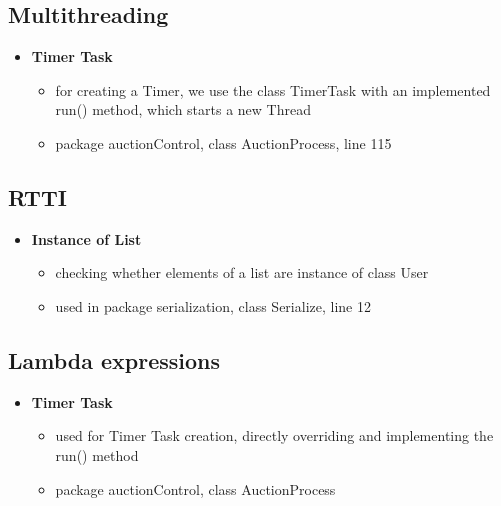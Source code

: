 \documentclass[
]{report}
\providecommand{\tightlist}{%
  \setlength{\itemsep}{0pt}\setlength{\parskip}{0pt}}
\begin{document}
\hypertarget{multithreading}{%
\subsection{Multithreading}\label{multithreading}}

\begin{itemize}
\tightlist
\item
  \textbf{Timer Task}

  \begin{itemize}
  \tightlist
  \item
    for creating a Timer, we use the class TimerTask with an implemented run() method, which starts a new Thread
  \item
    package auctionControl, class AuctionProcess, line 115
  \end{itemize}
\end{itemize}

\hypertarget{rtti}{%
\subsection{RTTI}\label{rtti}}

\begin{itemize}
\tightlist
\item
  \textbf{Instance of List}

  \begin{itemize}
  \tightlist
  \item
    checking whether elements of a list are instance of class User
  \item
    used in package serialization, class Serialize, line 12
  \end{itemize}
\end{itemize}

\hypertarget{lambda-expressions}{%
\subsection{Lambda expressions}\label{lambda-expressions}}

\begin{itemize}
\tightlist
\item
  \textbf{Timer Task}

  \begin{itemize}
  \tightlist
  \item
    used for Timer Task creation, directly overriding and implementing the run() method
  \item
    package auctionControl, class AuctionProcess
  \end{itemize}
\end{itemize}
\end{document}
